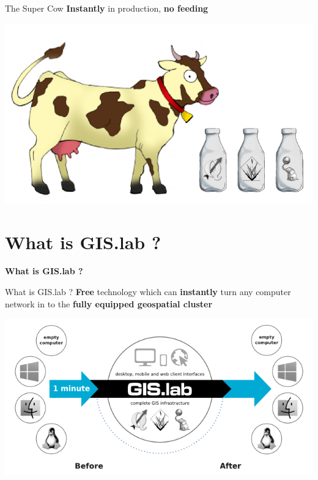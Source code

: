 \documentclass[12pt]{beamer}
\begin{document}
\begin{frame}{The Super Cow}
	\textbf{Instantly} in production, \textbf{no feeding}
	\begin{center}
		\includegraphics[keepaspectratio=true,height=0.6\textheight]{images/cow-geospatial.png}
	\end{center}
\end{frame}


\section{What is GIS.lab ?}
\begin{frame}
	\begin{center}
		\LARGE\textbf{What is GIS.lab ?}
	\end{center}
\end{frame}

\begin{frame}{What is GIS.lab ?}
	\textbf{Free} technology which can \textbf{instantly} turn any computer network in to the \textbf{fully equipped geospatial cluster}
	\begin{center}
		\includegraphics[keepaspectratio=true,height=0.5\textheight]{images/gislab-schema.png}
	\end{center}
\end{frame}
\end{document}
